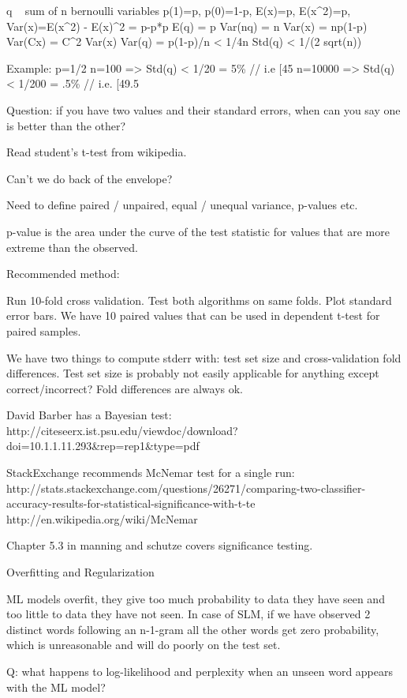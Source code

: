 q ~ sum of n bernoulli variables
p(1)=p, p(0)=1-p, E(x)=p, E(x^2)=p, Var(x)=E(x^2) - E(x)^2 = p-p*p 
E(q) = p
Var(nq) = n Var(x) = np(1-p)
Var(Cx) = C^2 Var(x)
Var(q) = p(1-p)/n < 1/4n
Std(q) < 1/(2 sqrt(n))

Example: p=1/2
n=100 => Std(q) < 1/20 = 5\%  // i.e [45%
n=10000 => Std(q) < 1/200 = .5\% // i.e. [49.5%

Question: if you have two values and their standard errors, when can
you say one is better than the other?

Read student's t-test from wikipedia.

Can't we do back of the envelope?

Need to define paired / unpaired, equal / unequal variance, p-values
etc.

p-value is the area under the curve of the test statistic for values
that are more extreme than the observed.

Recommended method:

Run 10-fold cross validation.
Test both algorithms on same folds.
Plot standard error bars.
We have 10 paired values that can be used in dependent t-test for
paired samples.

We have two things to compute stderr with: test set size and
cross-validation fold differences.  Test set size is probably not
easily applicable for anything except correct/incorrect?  Fold
differences are always ok.

David Barber has a Bayesian test:
http://citeseerx.ist.psu.edu/viewdoc/download?doi=10.1.1.11.293&rep=rep1&type=pdf

StackExchange recommends McNemar test for a single run:
http://stats.stackexchange.com/questions/26271/comparing-two-classifier-accuracy-results-for-statistical-significance-with-t-te
http://en.wikipedia.org/wiki/McNemar%

Chapter 5.3 in manning and schutze covers significance testing.



Overfitting and Regularization

ML models overfit, they give too much probability to data they have
seen and too little to data they have not seen.  In case of SLM, if we
have observed 2 distinct words following an n-1-gram all the other
words get zero probability, which is unreasonable and will do poorly
on the test set.

Q: what happens to log-likelihood and perplexity when an unseen word
appears with the ML model?



